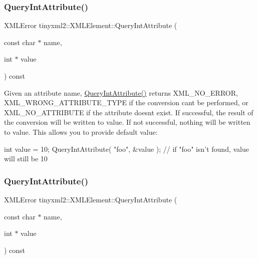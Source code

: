 \subsubsection{\texorpdfstring{Query\+Int\+Attribute()}{QueryIntAttribute()}\hspace{0.1cm}{\footnotesize\ttfamily [1/2]}}
{\footnotesize\ttfamily X\+M\+L\+Error tinyxml2\+::\+X\+M\+L\+Element\+::\+Query\+Int\+Attribute (\begin{DoxyParamCaption}\item[{const char $\ast$}]{name,  }\item[{int $\ast$}]{value }\end{DoxyParamCaption}) const\hspace{0.3cm}{\ttfamily [inline]}}

Given an attribute name, \hyperlink{classtinyxml2_1_1XMLElement_a8a78bc1187c1c45ad89f2690eab567b1}{Query\+Int\+Attribute()} returns X\+M\+L\+\_\+\+N\+O\+\_\+\+E\+R\+R\+OR, X\+M\+L\+\_\+\+W\+R\+O\+N\+G\+\_\+\+A\+T\+T\+R\+I\+B\+U\+T\+E\+\_\+\+T\+Y\+PE if the conversion can\textquotesingle{}t be performed, or X\+M\+L\+\_\+\+N\+O\+\_\+\+A\+T\+T\+R\+I\+B\+U\+TE if the attribute doesn\textquotesingle{}t exist. If successful, the result of the conversion will be written to \textquotesingle{}value\textquotesingle{}. If not successful, nothing will be written to \textquotesingle{}value\textquotesingle{}. This allows you to provide default value\+:

\begin{DoxyVerb}int value = 10;
QueryIntAttribute( "foo", &value );     // if "foo" isn't found, value will still be 10
\end{DoxyVerb}
 \mbox{\label{classtinyxml2_1_1XMLElement_a8a78bc1187c1c45ad89f2690eab567b1}} 
\subsubsection{\texorpdfstring{Query\+Int\+Attribute()}{QueryIntAttribute()}\hspace{0.1cm}{\footnotesize\ttfamily [2/2]}}
{\footnotesize\ttfamily X\+M\+L\+Error tinyxml2\+::\+X\+M\+L\+Element\+::\+Query\+Int\+Attribute (\begin{DoxyParamCaption}\item[{const char $\ast$}]{name,  }\item[{int $\ast$}]{value }\end{DoxyParamCaption}) const\hspace{0.3cm}{\ttfamily [inline]}}

